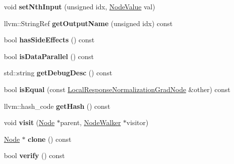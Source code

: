 \begin{DoxyCompactItemize}
\item 
\mbox{\label{classglow_1_1_local_response_normalization_grad_node_aa7bb7baaed9aa5946d5960b5c5da9345}} 
void {\bfseries set\+Nth\+Input} (unsigned idx, \hyperlink{structglow_1_1_node_value}{Node\+Value} val)
\item 
\mbox{\label{classglow_1_1_local_response_normalization_grad_node_a49223ed1e0dec8c5205897b76b220352}} 
llvm\+::\+String\+Ref {\bfseries get\+Output\+Name} (unsigned idx) const
\item 
\mbox{\label{classglow_1_1_local_response_normalization_grad_node_a203f53a9a627277a225fed45ea076edc}} 
bool {\bfseries has\+Side\+Effects} () const
\item 
\mbox{\label{classglow_1_1_local_response_normalization_grad_node_add52405b4341a39d13e77861ed4dc06e}} 
bool {\bfseries is\+Data\+Parallel} () const
\item 
\mbox{\label{classglow_1_1_local_response_normalization_grad_node_af021fcfbaebbdb5ee68873e480b9f774}} 
std\+::string {\bfseries get\+Debug\+Desc} () const
\item 
\mbox{\label{classglow_1_1_local_response_normalization_grad_node_a96419acf92330447badbc13d7dbe0732}} 
bool {\bfseries is\+Equal} (const \hyperlink{classglow_1_1_local_response_normalization_grad_node}{Local\+Response\+Normalization\+Grad\+Node} \&other) const
\item 
\mbox{\label{classglow_1_1_local_response_normalization_grad_node_a1f8ac214bd9cc52c52dc9e065d1de1a6}} 
llvm\+::hash\+\_\+code {\bfseries get\+Hash} () const
\item 
\mbox{\label{classglow_1_1_local_response_normalization_grad_node_ad39ae4449b4e9cfe0cecf88a0e3b61d8}} 
void {\bfseries visit} (\hyperlink{classglow_1_1_node}{Node} $\ast$parent, \hyperlink{classglow_1_1_node_walker}{Node\+Walker} $\ast$visitor)
\item 
\mbox{\label{classglow_1_1_local_response_normalization_grad_node_a126f6ea246eefbfaeb48be6aa0e0c8ee}} 
\hyperlink{classglow_1_1_node}{Node} $\ast$ {\bfseries clone} () const
\item 
\mbox{\label{classglow_1_1_local_response_normalization_grad_node_a86d8f0ed26e3980aaa492ab140bc41b2}} 
bool {\bfseries verify} () const
\end{DoxyCompactItemize}
